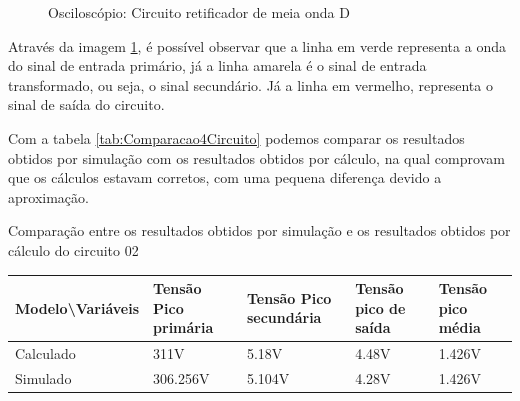 \begin{figure}[H]
    \centering
    \caption{Osciloscópio: Circuito retificador de meia onda D}
    \vspace{-0.3cm}
    \label{fig:OsciloscopioCircuito04}
\end{figure}

Através da imagem \ref{fig:OsciloscopioCircuito04}, é possível observar que a linha em verde representa a onda do sinal de entrada primário, já a linha amarela é o sinal de entrada transformado, ou seja, o sinal secundário. Já a linha em vermelho, representa o sinal de saída do circuito.

Com a tabela \ref{tab:Comparacao4Circuito} podemos comparar os resultados obtidos por simulação com os resultados obtidos por cálculo, na qual comprovam que os cálculos estavam corretos, com uma pequena diferença devido a aproximação.

\begin{quadro}[H]
    \centering
    \caption{Comparação entre os resultados obtidos por simulação e os resultados obtidos por cálculo do circuito 02}
    \begin{tabular}{|C{0.19\textwidth}|C{0.18\textwidth}|C{0.18\textwidth}|C{0.18\textwidth}|C{0.18\textwidth}|}
        \hline
        \textbf{Modelo\textbackslash{}Variáveis} & \textbf{Tensão Pico primária} & \textbf{Tensão Pico secundária} & \textbf{Tensão pico de saída} & \textbf{Tensão pico média}\\
        \hline
        Calculado & 311V & 5.18V & 4.48V & 1.426V \\
        \hline
        Simulado & 306.256V & 5.104V & 4.28V & 1.426V \\
        \hline
    \end{tabular}
    \vspace{-0.6cm}
    \label{tab:Comparacao4Circuito}
\end{quadro}


